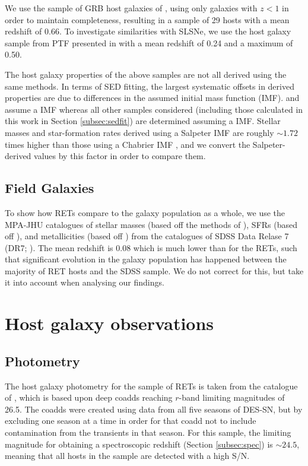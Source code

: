 \documentclass[fleqn,usenatbib,]{mnras}
\newcommand{\phil}[1]{\color{red}#1 \color{black}}
\begin{document}
We use the sample of GRB host galaxies of \citet{Kruehler2015}, using only galaxies with $z<1$ in order to maintain completeness, resulting in a sample of 29 hosts with a mean redshift of 0.66. To investigate similarities with SLSNe, we use the host galaxy sample from PTF presented in \citet{Perley2016c} with a mean redshift of 0.24 and a maximum of 0.50.

The host galaxy properties of the above samples are not all derived using the same methods. In terms of SED fitting, the largest systematic offsets in derived properties are due to differences in the assumed initial mass function (IMF). \citet{Stoll2013} and \citet{Drout2014} assume a \citet{Salpeter1955} IMF whereas all other samples considered (including those calculated in this work in Section \ref{subsec:sedfit}) are determined assuming a \citet{Chabrier2003} IMF. Stellar masses and star-formation rates derived using a Salpeter IMF are roughly $\sim 1.72$ times higher than those using a Chabrier IMF \citep{Speagle2014}, and we convert the Salpeter-derived values by this factor in order to compare them.

\subsection{Field Galaxies \label{subsubsec:sdss}}

\phil{To show how RETs compare to the galaxy population as a whole, we use the MPA-JHU catalogues of stellar masses (based off the methods of \citealt{Kauffmann2003,Salim2007}), SFRs (based off \citealt{Brinchmann2004}), and metallicities (based off \citealt{Tremonti2004}) from the  catalogues of SDSS Data Relase 7 (DR7; \citealt{Abazajian2009}). The mean redshift is 0.08 which is much lower than for the RETs, such that significant evolution in the galaxy population has happened between the majority of RET hosts and the SDSS sample. We do not correct for this, but take it into account when analysing our findings. }
\section{Host galaxy observations}
\label{sec:obs}
\subsection{Photometry \label{subsec:phot}}

The host galaxy photometry for the sample of RETs is taken from the catalogue of \citet{Wiseman2020}, which is based upon deep coadds reaching $r$-band limiting magnitudes of 26.5. The coadds were created using data from all five seasons of DES-SN, but by excluding one season at a time in order for that coadd not to include contamination from the transients in that season. For this sample, the limiting magnitude for obtaining a spectroscopic redshift (Section \ref{subsec:spec}) is $\sim 24.5$, meaning that all hosts in the sample are detected with a high S/N.
\end{document}
